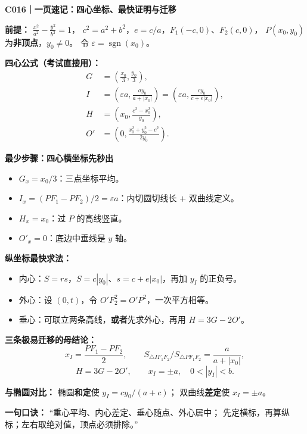 \begin{summarybox}
\textbf{C016｜一页速记：四心坐标、最快证明与迁移}

\textbf{前提：} $\frac{x^2}{a^2}-\frac{y^2}{b^2}=1$，
$c^2=a^2+b^2$，$e=c/a$，$F_1(-c,0)$、$F_2(c,0)$，
$P(x_0,y_0)$ 为\textbf{非顶点}，$y_0\ne0$。
令 $\varepsilon=\operatorname{sgn}(x_0)$。

\textbf{四心公式（考试直接用）：}
\begin{align*}
\boxed{G}&=\left(\frac{x_0}{3},\frac{y_0}{3}\right),\\
\boxed{I}&=\left(\varepsilon a,\frac{ay_0}{a+|x_0|}\right)
=\left(\varepsilon a,\frac{cy_0}{c+e|x_0|}\right),\\
\boxed{H}&=\left(x_0,\frac{c^2-x_0^2}{y_0}\right),\\
\boxed{O'}&=\left(0,\frac{x_0^2+y_0^2-c^2}{2y_0}\right).
\end{align*}

\textbf{最少步骤：四心横坐标先秒出}
\begin{itemize}
  \item $G_x=x_0/3$：三点坐标平均。
  \item $I_x=(PF_1-PF_2)/2=\varepsilon a$：内切圆切线长 $+$ 双曲线定义。
  \item $H_x=x_0$：过 $P$ 的高线竖直。
  \item $O'_x=0$：底边中垂线是 $y$ 轴。
\end{itemize}

\textbf{纵坐标最快求法：}
\begin{itemize}
  \item 内心：$S=rs$，$S=c|y_0|$、$s=c+e|x_0|$，再加 $y_I$ 的正负号。
  \item 外心：设 $(0,t)$，令 $O'F_2^2=O'P^2$，一次平方相等。
  \item 垂心：可联立两条高线，\textbf{或者}先求外心，再用 $H=3G-2O'$。
\end{itemize}

\textbf{三条极易迁移的母结论：}
\[
\boxed{x_I=\frac{PF_1-PF_2}{2}},\qquad
\boxed{S_{\triangle IF_1F_2}/S_{\triangle PF_1F_2}
=\frac{a}{a+|x_0|}},
\]
\[
\boxed{H=3G-2O'},\qquad
\boxed{x_I=\pm a,\quad0<|y_I|<b}.
\]

\textbf{与椭圆对比：} 椭圆\textbf{和定}使 $y_I=cy_0/(a+c)$；
双曲线\textbf{差定}使 $x_I=\pm a$。

\textbf{一句口诀：} “重心平均、内心差定、垂心随点、外心居中；
先定横标，再算纵标；左右取绝对值，顶点必须排除。”
\end{summarybox}
